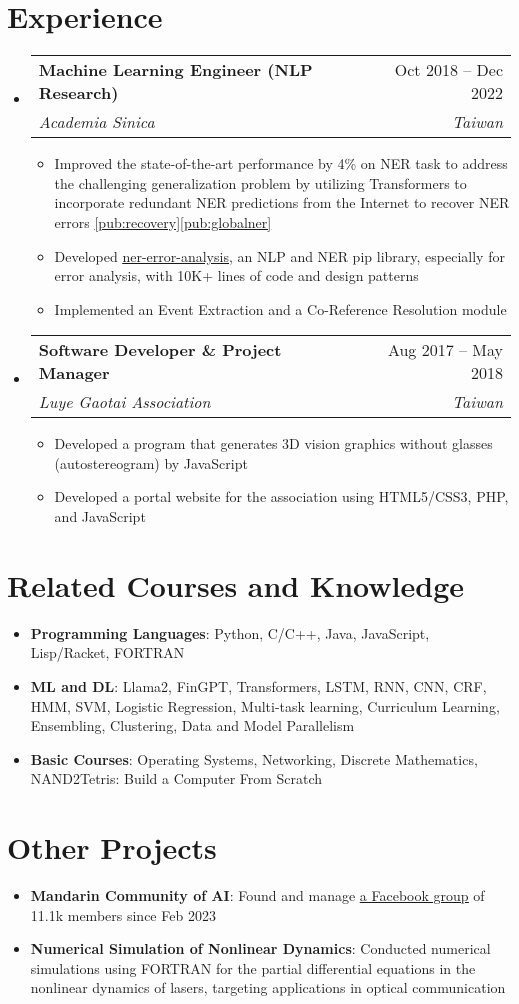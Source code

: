 \documentclass[letterpaper,11pt]{article}
\makeatletter
\newcommand{\resumeItem}[1]{
  \item\small{
    {#1 \vspace{-2pt}}
  }
}
\newcommand{\resumeSubheading}[4]{
  \vspace{-2pt}\item
    \begin{tabular*}{0.97\textwidth}[t]{l@{\extracolsep{\fill}}r}
      \textbf{#1} & #2 \\
      \textit{\small#3} & \textit{\small #4} \\
    \end{tabular*}\vspace{-7pt}
}
\newcommand{\resumeSubHeadingListStart}{\begin{itemize}[leftmargin=0.1in, label={}]}
\newcommand{\resumeSubHeadingListEnd}{\end{itemize}}
\newcommand{\resumeItemListStart}{\begin{itemize}}
\newcommand{\resumeItemListEnd}{\end{itemize}\vspace{-5pt}}
\newcommand{\titledItem}[2]{
  \item\small{
    {\textbf{#1}: #2 \vspace{-9pt}}
  }
}
\newcommand{\simpleListStart}{\begin{itemize}[leftmargin=0.15in, label={}]}
\newcommand{\simpleListEnd}{\end{itemize}\vspace{-5pt}}
\makeatother
\begin{document}
\section{Experience}
  \resumeSubHeadingListStart

    \resumeSubheading
      {Machine Learning Engineer (NLP Research)}{Oct 2018 -- Dec 2022}
      {Academia Sinica}{Taiwan}
      \resumeItemListStart
        \resumeItem{Improved the state-of-the-art performance by 4\% on NER task to address the challenging generalization problem by utilizing Transformers to incorporate redundant NER predictions from the Internet to recover NER errors \ref{pub:recovery}\ref{pub:globalner}}
        \resumeItem{Developed \href{https://pypi.org/project/ner-error-analysis/}{\underline{ner-error-analysis}}, an NLP and NER pip library, especially for error analysis, with 10K+ lines of code and design patterns}
        \resumeItem{Implemented an Event Extraction and a Co-Reference Resolution module}
      \resumeItemListEnd
      \resumeSubheading
          {Software Developer \& Project Manager}{Aug 2017 -- May 2018}{Luye Gaotai Association}{Taiwan}
          \resumeItemListStart
            \resumeItem{Developed a program that generates 3D vision graphics without glasses (autostereogram) by JavaScript}
            \resumeItem{Developed a portal website for the association using HTML5/CSS3, PHP, and JavaScript}
          \resumeItemListEnd
  \resumeSubHeadingListEnd

\section{Related Courses and Knowledge}
 \simpleListStart
    \titledItem{Programming Languages}{Python, C/C++, Java, JavaScript, Lisp/Racket, FORTRAN}
    \titledItem{ML and DL}{Llama2, FinGPT, Transformers, LSTM, RNN, CNN, CRF, HMM, SVM, Logistic Regression, Multi-task learning, Curriculum Learning, Ensembling, Clustering, Data and Model Parallelism}
    \titledItem{Basic Courses}{Operating Systems, Networking, Discrete Mathematics, NAND2Tetris: Build a Computer From Scratch}
 \simpleListEnd

 \section{Other Projects}
    \simpleListStart
        \titledItem{Mandarin Community of AI}{Found and manage \href{https://www.facebook.com/groups/demoai}{\underline{a Facebook group}} of 11.1k members since Feb 2023}
        \titledItem{Numerical Simulation of Nonlinear Dynamics}{Conducted numerical simulations using FORTRAN for the partial differential equations in the nonlinear dynamics of lasers, targeting applications in optical communication}
    \simpleListEnd
\end{document}
